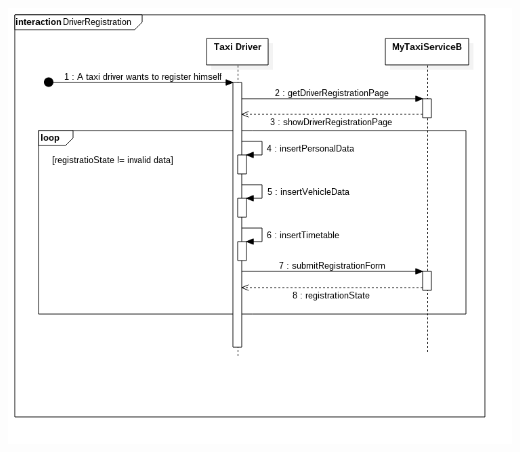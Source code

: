 \documentclass[11pt,titlepage]{article} %
\begin{document}
\begin{enumerate}
		\begin{center}
		\includegraphics[scale=0.52]{usecase12.png}
		\end{center}
	\end{enumerate}
	\newpage
\end{document}
